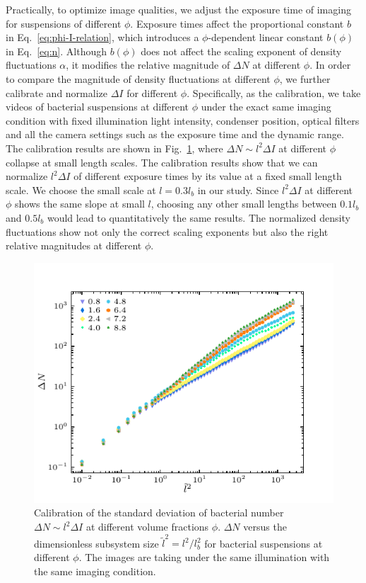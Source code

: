 Practically, to optimize image qualities, we adjust the exposure time of imaging for suspensions of different $\phi$. Exposure times affect the proportional constant $b$ in Eq.~\ref{eq:phi-I-relation}, which introduces a $\phi$-dependent linear constant $b(\phi)$ in Eq.~\ref{eq:n}. Although $b(\phi)$ does not affect the scaling exponent of density fluctuations $\alpha$, it modifies the relative magnitude of $\Delta N$ at different $\phi$. In order to compare the magnitude of density fluctuations at different $\phi$,  we further calibrate and normalize $\Delta I$ for different $\phi$. Specifically, as the calibration, we take videos of bacterial suspensions at different $\phi$ under the exact same imaging condition with fixed illumination light intensity, condenser position, optical filters and all the camera settings such as the exposure time and the dynamic range. The calibration results are shown in Fig.~\ref{fig:same-conditions}, where $\Delta N \sim l^2 \Delta I$ at different $\phi$ collapse at small length scales. The calibration results show that we can normalize $l^2 \Delta I$ of different exposure times by its value at a fixed small length scale. We choose the small scale at $l = 0.3l_b$ in our study. Since $l^2 \Delta I$ at different $\phi$ shows the same slope at small $l$, choosing any other small lengths between $0.1l_b$ and $0.5l_b$ would lead to quantitatively the same results. The normalized density fluctuations show not only the correct scaling exponents but also the right relative magnitudes at different $\phi$.

\begin{figure}[ht]
  \begin{center}
    \includegraphics[width=4.5in]{Figs/5-GNF/GNF-normalization.pdf}
    \caption[Normalization of GNF at Different Volume Fractions]
    {
    Calibration of the standard deviation of bacterial number $\Delta N \sim l^2\Delta I$ at different volume fractions $\phi$. $\Delta N$ versus the dimensionless subsystem size $\tilde{l}^2 = l^2/l_b^2$ for bacterial suspensions at different $\phi$. The images are taking under the same illumination with the same imaging condition.
    }
    \label{fig:same-conditions}
  \end{center}
\end{figure}

